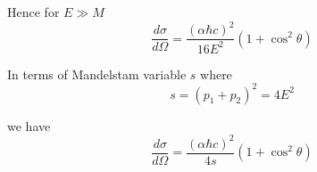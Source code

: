 Hence for $E\gg M$
\begin{equation*}
\frac{d\sigma}{d\Omega}=\frac{(\alpha\hbar c)^2}{16E^2}\left(1+\cos^2\theta\right)
\end{equation*}

In terms of Mandelstam variable $s$ where
\begin{equation*}
s=(p_1+p_2)^2=4E^2
\end{equation*}

we have
\begin{equation*}
\frac{d\sigma}{d\Omega}=\frac{(\alpha\hbar c)^2}{4s}\left(1+\cos^2\theta\right)
\end{equation*}


